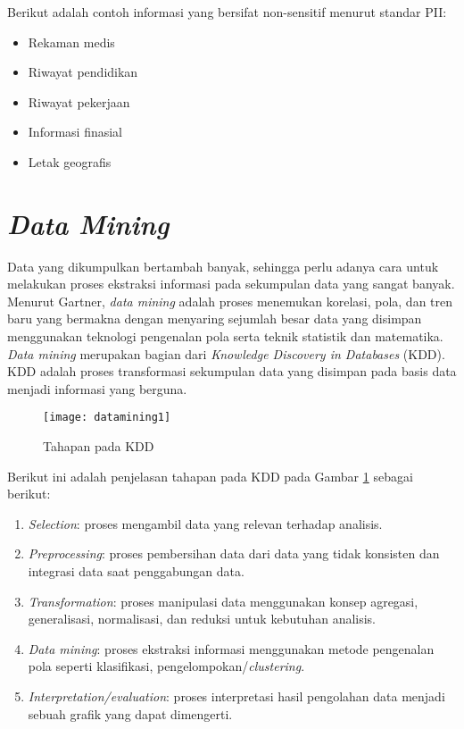 \noindent Berikut adalah contoh informasi yang bersifat non-sensitif menurut standar PII:
\begin{itemize}
\item Rekaman medis
\item Riwayat pendidikan
\item Riwayat pekerjaan 
\item Informasi finasial
\item Letak geografis
\end{itemize}

\section{\textit{Data Mining}}
Data yang dikumpulkan bertambah banyak, sehingga perlu adanya cara untuk melakukan proses ekstraksi informasi pada sekumpulan data yang sangat banyak. Menurut Gartner, \textit{data mining} adalah proses menemukan korelasi, pola, dan tren baru yang bermakna dengan menyaring sejumlah besar data yang disimpan menggunakan teknologi pengenalan pola serta teknik statistik dan matematika. \textit{Data mining} merupakan bagian dari \textit{Knowledge Discovery in Databases} (KDD). KDD adalah proses transformasi sekumpulan data yang disimpan pada basis data menjadi informasi yang berguna.\\

\begin{figure}[H]
	\centering
	\texttt{[image: datamining1]}
	\caption{Tahapan pada KDD}
	\label{fig:datamining1}
\end{figure}

\noindent Berikut ini adalah penjelasan tahapan pada KDD pada Gambar \ref{fig:datamining1} sebagai berikut:

\begin{enumerate}
\item \textit{Selection}: proses mengambil data yang relevan terhadap analisis.
\item \textit{Preprocessing}: proses pembersihan data dari data yang tidak konsisten dan integrasi data saat penggabungan data.
\item \textit{Transformation}: proses manipulasi data menggunakan konsep agregasi, generalisasi, normalisasi, dan reduksi untuk kebutuhan analisis.
\item \textit{Data mining}: proses ekstraksi informasi menggunakan metode pengenalan pola seperti klasifikasi, pengelompokan/\textit{clustering}.
\item \textit{Interpretation/evaluation}: proses interpretasi hasil pengolahan data menjadi sebuah grafik yang dapat dimengerti.
\end{enumerate}


